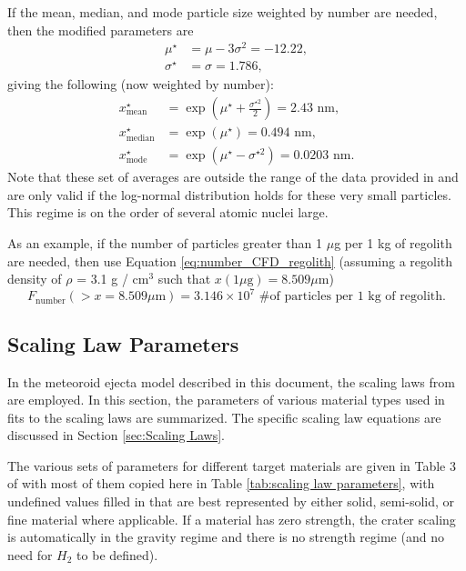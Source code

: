 \documentclass{article}
\begin{document}
If the mean, median, and mode particle size weighted by number are needed, then the modified parameters are
\begin{align}
\mu^\star &= \mu - 3\sigma^2 = -12.22,\\
\sigma^\star &= \sigma = 1.786,
\end{align}
giving the following (now weighted by number):
\begin{align}
x^\star_{\text{mean}} &= \exp\left(\mu^\star + \frac{\sigma^{\star 2}}{2}\right) = 2.43 \text{ nm},\\
x^\star_{\text{median}} &= \exp(\mu^\star) = 0.494 \text{ nm},\\
x^\star_{\text{mode}} &=  \exp\left(\mu^\star - \sigma^{\star 2}\right) = 0.0203 \text{ nm}.
\end{align}
Note that these set of averages are outside the range of the data provided in \cite{carrier2003particle} and are only valid if the log-normal distribution holds for these very small particles. This regime is on the order of several atomic nuclei large.


As an example, if the number of particles greater than 1 $\mu$g per 1 kg of regolith are needed, then use Equation \eqref{eq:number_CFD_regolith} (assuming a regolith density of $\rho$ = 3.1 g / cm$^3$ such that $x(1 \mu\text{g}) = 8.509 \mu\text{m}$)
\begin{equation}
F_{\text{number}}(> x = 8.509 \mu\text{m}) = 3.146\times 10^{7} \text{ \# of particles per 1 kg of regolith}.
\end{equation}


\subsection{Scaling Law Parameters}\label{ssec:Scaling Law Parameters}
In the meteoroid ejecta model described in this document, the scaling laws from \cite{housen2011ejecta} are employed. In this section, the parameters of various material types used in fits to the scaling laws are summarized. The specific scaling law equations are discussed in Section \ref{sec:Scaling Laws}.

The various sets of parameters for different target materials are given in Table 3 of \cite{housen2011ejecta} with most of them copied here in Table \ref{tab:scaling law parameters}, with undefined values filled in that are best represented by either solid, semi-solid, or fine material where applicable. If a material has zero strength, the crater scaling is automatically in the gravity regime and there is no strength regime (and no need for $H_2$ to be defined).
\end{document}
